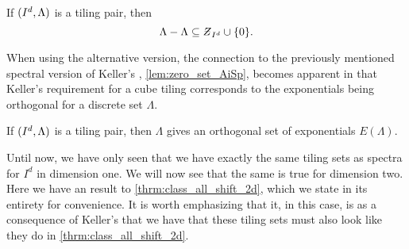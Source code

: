 \documentclass[../thesis.tex]{subfiles}
\begin{document}
\begin{theorem}\label{thrm:keller_alternative}
    If $(I^d,\Lambda)$ is a tiling pair, then 
    \begin{equation*}
        \Lambda - \Lambda \subseteq \Zstroke_{I^d} \cup \braq{0}.
    \end{equation*} 
\end{theorem}
When using the alternative version, the connection to the previously mentioned spectral version of Keller's  , \cref{lem:zero_set_AiSp}, becomes apparent in that Keller's requirement for a cube tiling corresponds to the exponentials being orthogonal for a discrete set $\Lambda$.  %
\begin{corollary}\label{cor:tiling_pair_implies_orthogonal}
    If $(I^d, \Lambda)$ is a tiling pair, then $\Lambda$ gives an orthogonal set of exponentials $E(\Lambda)$.
\end{corollary}

Until now, we have only seen that we have exactly the same tiling sets as spectra for $I^d$ in dimension one. We will now see that the same is true for dimension two. Here we have an  result to \cref{thrm:class_all_shift_2d}, which we state in its entirety for convenience. It is worth emphasizing that it, in this case, is as a consequence of Keller's  that we have that these tiling sets must also look like they do in \cref{thrm:class_all_shift_2d}.
\end{document}
